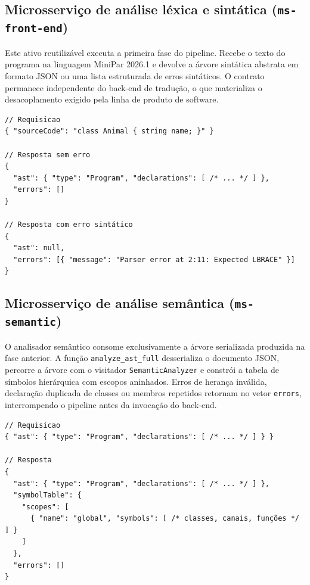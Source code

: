 \subsection{Microsserviço de análise léxica e sintática (\texttt{ms-front-end})}

Este ativo reutilizável executa a primeira fase do pipeline. Recebe o texto do programa na linguagem MiniPar 2026.1 e devolve a árvore sintática abstrata em formato JSON ou uma lista estruturada de erros sintáticos. O contrato permanece independente do back-end de tradução, o que materializa o desacoplamento exigido pela linha de produto de software.

\begin{lstlisting}[caption={Requisição e resposta de \texttt{POST /parse} (porta 3001)}]
// Requisicao
{ "sourceCode": "class Animal { string name; }" }

// Resposta sem erro
{
  "ast": { "type": "Program", "declarations": [ /* ... */ ] },
  "errors": []
}

// Resposta com erro sintático
{
  "ast": null,
  "errors": [{ "message": "Parser error at 2:11: Expected LBRACE" }]
}
\end{lstlisting}

\subsection{Microsserviço de análise semântica (\texttt{ms-semantic})}

O analisador semântico consome exclusivamente a árvore serializada produzida na fase anterior. A função \texttt{analyze\_ast\_full} desserializa o documento JSON, percorre a árvore com o visitador \texttt{SemanticAnalyzer} e constrói a tabela de símbolos hierárquica com escopos aninhados. Erros de herança inválida, declaração duplicada de classes ou membros repetidos retornam no vetor \texttt{errors}, interrompendo o pipeline antes da invocação do back-end.

\begin{lstlisting}[caption={Requisição e resposta de \texttt{POST /analyze} (porta 3002)}]
// Requisicao
{ "ast": { "type": "Program", "declarations": [ /* ... */ ] } }

// Resposta
{
  "ast": { "type": "Program", "declarations": [ /* ... */ ] },
  "symbolTable": {
    "scopes": [
      { "name": "global", "symbols": [ /* classes, canais, funções */ ] }
    ]
  },
  "errors": []
}
\end{lstlisting}


